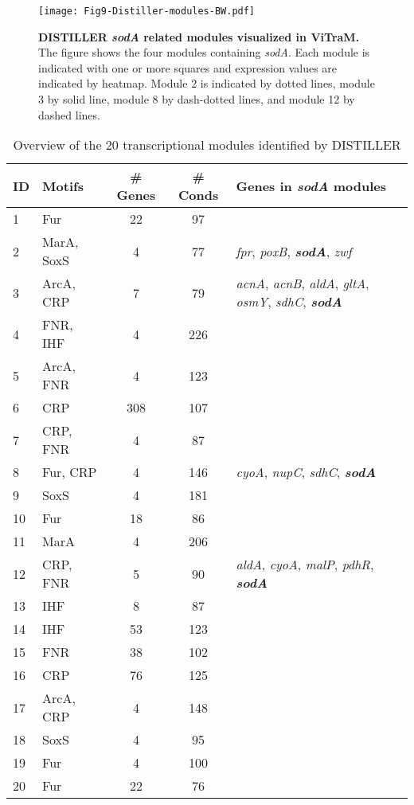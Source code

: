 \begin{figure}[b]
	\centering
  	\texttt{[image: Fig9-Distiller-modules-BW.pdf]}
	\caption[DISTILLER \textit{sodA} related modules visualized in ViTraM] 
	{\textbf{DISTILLER \textit{sodA} related modules visualized in ViTraM.}
	The figure shows the four modules containing \textit{sodA}. Each module is 
	indicated with one or more squares and expression values are indicated by 
	heatmap. Module 2 is indicated by dotted lines, module 3 by solid line, 
	module 8 by dash-dotted lines, and module 12 by dashed lines.}
	\label{fig:vitram}
\end{figure}

\begin{table}[tb]
	\caption{Overview of the 20 transcriptional modules identified by DISTILLER}
	\label{tab:distModules}
	\begin{small}
	\begin{tabular}{p{5mm} p{2cm} c c p{4.5cm}}
	\toprule
	{\bf ID} & {\bf Motifs} & {\bf \# Genes} & {\bf \# Conds} & {\bf Genes in 
	\textit{sodA} modules} \\
	\midrule
	1 & Fur	& 22 & 97 & \\
	2 &	MarA, SoxS & 4 & 77	& \textit{fpr}, \textit{poxB}, 	
	\textit{\textbf{sodA}}, \textit{zwf} \\
	3 &	ArcA, CRP &	7 &	79 & \textit{acnA}, \textit{acnB}, \textit{aldA}, 
	\textit{gltA}, \textit{osmY}, \textit{sdhC}, \textit{\textbf{sodA}} \\
	4 &	FNR, IHF & 4 & 226 & \\
	5 &	ArcA, FNR &	4 &	123	& \\	
	6 &	CRP	& 308 &	107	& \\
	7 &	CRP, FNR & 4 & 87 & \\
	8 &	Fur, CRP & 4 & 146 & \textit{cyoA}, \textit{nupC}, \textit{sdhC}, 
	\textit{\textbf{sodA}} \\
	9 &	SoxS & 4 &	181	& \\
	10 & Fur & 18 & 86	& \\
	11 & MarA &	4 &	206	& \\
	12 & CRP, FNR & 5 &	90 & \textit{aldA}, \textit{cyoA}, 
	\textit{malP}, \textit{pdhR}, \textit{\textbf{sodA}} \\
	13 & IHF &	8 &	87	& \\
	14 & IHF &	53 & 123	& \\
	15 & FNR &	38 & 102	& \\
	16 & CRP &	76 & 125	& \\
	17 & ArcA, CRP &  4 &	148	& \\
	18 & SoxS &	4 &	95	& \\
	19 & Fur & 4 &	100	& \\
	20 & Fur & 22 &	76 & \\
	\bottomrule
	\end{tabular}
	\end{small}
\end{table}

